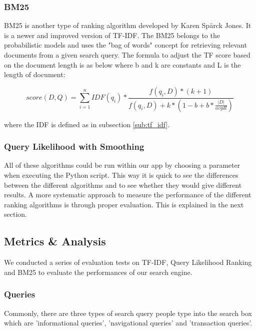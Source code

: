 
\subsubsection{BM25} %
\label{ssub:BM25}

BM25 is another type of ranking algorithm developed by Karen Spärck Jones. It is a newer and improved version of TF-IDF. The BM25 belongs to the probabilistic models and uses the "bag of words" concept for retrieving relevant documents from a given search query. The formula to adjust the TF score based on the document length is as below where b and k are constants and L is the length of document:

$$ score(D, Q) = \sum_{i=1}^n IDF(q_i) * \frac{f(q_i, D)* (k + 1)}{f(q_i, D) + k * (1-b + b * \frac{|D|}{avgdl})}$$

where the IDF is defined as in subsection \ref{sub:tf_idf}.


\subsubsection{Query Likelihood with Smoothing} %
\label{ssub:query_likelihood_with_smoothing}


All of these algorithms could be run within our app by choosing a parameter when executing the Python script. This way it is quick to see the differences between the different algorithms and to see whether they would give different results. A more systematic approach to measure the performance of the different ranking algorithms is through proper evaluation. This is explained in the next section.



\subsection{Metrics \& Analysis} %
\label{sub:metrics_&_analysis}

We conducted a series of evaluation tests on TF-IDF, Query Likelihood Ranking and BM25 to evaluate the performances of our search engine.
\subsubsection{Queries}
Commonly, there are three types of search query people type into the search box which are 'informational queries', 'navigational queries' and 'transaction queries'. 

